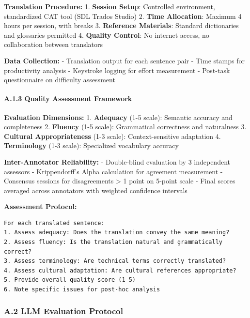 \documentclass[12pt,a4paper]{article}
\begin{document}
{{{{{\textbf{Translation Procedure:} 1. \textbf{Session Setup}: Controlled
environment, standardized CAT tool (SDL Trados Studio) 2. \textbf{Time
Allocation}: Maximum 4 hours per session, with breaks 3.
\textbf{Reference Materials}: Standard dictionaries and glossaries
permitted 4. \textbf{Quality Control}: No internet access, no
collaboration between translators

\textbf{Data Collection:} - Translation output for each sentence pair -
Time stamps for productivity analysis - Keystroke logging for effort
measurement - Post-task questionnaire on difficulty assessment

\hypertarget{a.1.3-quality-assessment-framework}{%
\paragraph{A.1.3 Quality Assessment
Framework}\label{a.1.3-quality-assessment-framework}}

\textbf{Evaluation Dimensions:} 1. \textbf{Adequacy} (1-5 scale):
Semantic accuracy and completeness 2. \textbf{Fluency} (1-5 scale):
Grammatical correctness and naturalness 3. \textbf{Cultural
Appropriateness} (1-3 scale): Context-sensitive adaptation 4.
\textbf{Terminology} (1-3 scale): Specialized vocabulary accuracy

\textbf{Inter-Annotator Reliability:} - Double-blind evaluation by 3
independent assessors - Krippendorff's Alpha calculation for agreement
measurement - Consensus sessions for disagreements \textgreater{} 1
point on 5-point scale - Final scores averaged across annotators with
weighted confidence intervals

\textbf{Assessment Protocol:}

\begin{verbatim}
For each translated sentence:
1. Assess adequacy: Does the translation convey the same meaning?
2. Assess fluency: Is the translation natural and grammatically correct?
3. Assess terminology: Are technical terms correctly translated?
4. Assess cultural adaptation: Are cultural references appropriate?
5. Provide overall quality score (1-5)
6. Note specific issues for post-hoc analysis
\end{verbatim}

\hypertarget{a.2-llm-evaluation-protocol}{%
\subsubsection{A.2 LLM Evaluation
Protocol}\label{a.2-llm-evaluation-protocol}}

}}}}}
\end{document}
